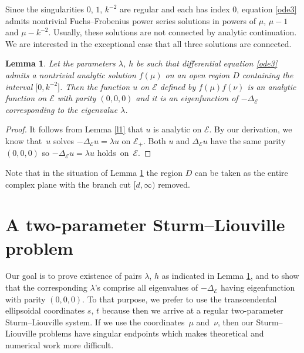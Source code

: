 \documentclass[10pt,a4paper]{amsart}
\newtheorem{Lemma}[thm]{Lemma}
\newcommand{\E}{\mathcal{E}}
\newcommand{\D}{\Delta_\E}
\numberwithin{equation}{section}
\begin{document}
Since the singularities $0$, $1$, $k^{-2}$ are regular and each has index $0$, equation \eqref{ode3}
admits nontrivial Fuchs--Frobenius power series solutions in powers of $\mu$, $\mu-1$ and $\mu-k^{-2}$.
Usually, these solutions are not connected by analytic continuation.
We are interested in the exceptional case that all three solutions are connected.

\begin{Lemma}\label{l2}
Let the parameters $\lambda$, $h$ be such that differential equation \eqref{ode3}
admits a nontrivial analytic solution $f(\mu)$ on an open region $D$ containing the interval $\bigl[0,k^{-2}\bigr]$.
Then the function $u$ on $\E$ defined by $f(\mu)f(\nu)$ is an analytic function on $\E$ with parity $(0,0,0)$ and it is an eigenfunction of $-\D$
corresponding to the eigenvalue $\lambda$.
\end{Lemma}
\begin{proof}
It follows from Lemma \ref{l1} that $u$ is analytic on $\E$.
By our derivation, we know that~$u$ solves $-\D u=\lambda u$ on $\E_+$.
Both $u$ and $\D u$ have the same parity $(0,0,0)$ so $-\D u=\lambda u$ holds~on~$\E$.
\end{proof}

Note that in the situation of Lemma \ref{l2} the region $D$ can be taken as the entire complex plane with the branch cut $[d,\infty)$ removed.

\section{A two-parameter Sturm--Liouville problem}\label{twopara}

Our goal is to prove existence of pairs $\lambda$, $h$ as indicated in Lemma \ref{l2}, and to show
that the corresponding $\lambda$'s comprise all eigenvalues of $-\D$ having eigenfunction with parity $(0,0,0)$.
To that purpose, we prefer to use the transcendental ellipsoidal coordinates $s$, $t$ because then we arrive at
a regular two-parameter Sturm--Liouville system.
If we use the coordinates~$\mu$ and~$\nu$, then our Sturm--Liouville problems have singular endpoints which
makes theoretical and numerical work more difficult.
\end{document}
